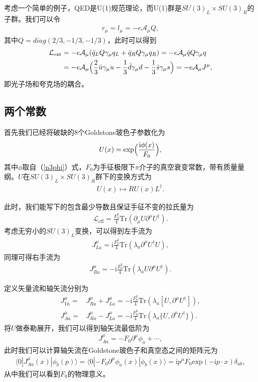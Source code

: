 \documentclass[aps,tightenlines,16pt]{ctexart}
\numberwithin{equation}{section}
\newcommand{\mL}{\mathcal{L}}
\begin{document}
考虑一个简单的例子，QED是U(1)规范理论，而U(1)群是$SU(3)_L\times SU(3)_R$的子群。我们可以令
\begin{align}
   r_{\mu} = l_{\mu} = -e \mathcal{A}_{\mu} Q,
\end{align}
其中$Q=diag(2/3,-1/3,-1/3)$，此时可以得到
\begin{align}
   \begin{aligned}
      \mL_{\text{ext}} &= -e\mathcal{A}_{\mu}(\bar{q}_L Q \gamma_{\mu} q_L + \bar{q}_R Q \gamma_{\mu}q_R)=-e\mathcal{A}_{\mu}\bar{q}Q\gamma_{\mu}q\\
      &=-e\mathcal{A}_{\mu}\Bigl(\frac{2}{3}\bar{u}\gamma_{\mu}u-\frac{1}{3}\bar{d}\gamma_{\mu}d-\frac{1}{3}\bar{s}\gamma_{\mu}s\Bigr)=-e\mathcal{A}_{\mu} J^{\mu},
   \end{aligned}
\end{align}
即光子场和夸克场的耦合。

\subsection{两个常数}
首先我们已经将破缺的8个Goldstone玻色子参数化为
\begin{align}
   U(x) = \text{exp}\Bigl(\frac{\mbox{i}\phi(x)}{F_0}\Bigr),
\end{align}
其中$\phi$取自（\ref{n3phi}）式，$F_0$为手征极限下$\pi$介子的真空衰变常数，带有质量量纲。$U$在$SU(3)_L\times SU(3)_R$群下的变换方式为
\begin{align}
   U(x) \mapsto RU(x)L^{\dagger}.
\end{align}

此时，我们能写下的包含最少导数且保证手征不变的拉氏量为
\begin{align}
   \mL_{\text{eff}}=\frac{F_0^2}{4}\text{Tr}(\partial_{\mu}U\partial^{\mu}U^{\dagger}).
\end{align}
考虑无穷小的$SU(3)_L$变换，可以得到左手流为
\begin{align}
   J^{\mu}_{La}=\mbox{i}\frac{F_0^2}{4}\text{Tr}(\lambda_a\partial^{\mu}U^{\dagger}U),
\end{align}
同理可得右手流为
\begin{align}
   J^{\mu}_{Ra}=-\mbox{i}\frac{F_0^2}{4}\text{Tr}(\lambda_aU\partial^{\mu}U^{\dagger}).
\end{align}

定义矢量流和轴矢流分别为
\begin{align}
   J_{Va}^{\mu}=&J_{Ra}^{\mu}+J_{La}^{\mu}=-\mbox{i}\frac{F_0^2}{4}\text{Tr}(\lambda_a[U,\partial^{\mu}U^{\dagger}]),\\
   J_{Aa}^{\mu}=&J_{Ra}^{\mu}-J_{La}^{\mu}=-\mbox{i}\frac{F_0^2}{4}\text{Tr}(\lambda_a\{U,\partial^{\mu}U^{\dagger}\}).
\end{align}
将$U$做泰勒展开，我们可以得到轴矢流最低阶为
\begin{align}
   J^{\mu}_{Aa}=-F_0\partial^{\mu}\phi_a+\cdots,
\end{align}
此时我们可以计算轴矢流在Goldstone玻色子和真空态之间的矩阵元为
\begin{align}
   \langle 0|J^{\mu}_{Aa}(x)|\phi_b(p)\rangle = \langle 0|-F_0 \partial^{\mu}\phi_a(x)|\phi_b(x)\rangle=\mbox{i}p^{\mu}F_0\text{exp}(-\mbox{i}p \cdot x)\delta_{ab},
\end{align}
从中我们可以看到$F_0$的物理意义。
\end{document}
